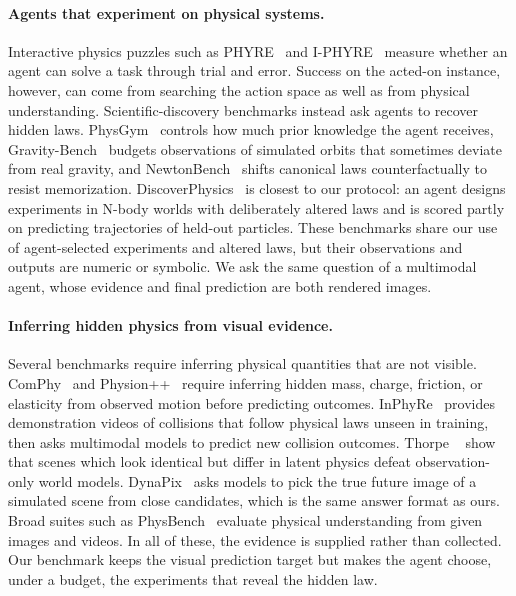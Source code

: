 \paragraph{Agents that experiment on physical systems.} Interactive physics puzzles such as PHYRE~\cite{phyre} and I-PHYRE~\cite{iphyre} measure whether an agent can solve a task through trial and error. Success on the acted-on instance, however, can come from searching the action space as well as from physical understanding. Scientific-discovery benchmarks instead ask agents to recover hidden laws. PhysGym~\cite{physgym} controls how much prior knowledge the agent receives, Gravity-Bench~\cite{gravitybench} budgets observations of simulated orbits that sometimes deviate from real gravity, and NewtonBench~\cite{newtonbench} shifts canonical laws counterfactually to resist memorization. DiscoverPhysics~\cite{discoverphysics} is closest to our protocol: an agent designs experiments in N-body worlds with deliberately altered laws and is scored partly on predicting trajectories of held-out particles. These benchmarks share our use of agent-selected experiments and altered laws, but their observations and outputs are numeric or symbolic. We ask the same question of a multimodal agent, whose evidence and final prediction are both rendered images.

\paragraph{Inferring hidden physics from visual evidence.} Several benchmarks require inferring physical quantities that are not visible. ComPhy~\cite{comphy} and Physion++~\cite{physionpp} require inferring hidden mass, charge, friction, or elasticity from observed motion before predicting outcomes. InPhyRe~\cite{inphyre} provides demonstration videos of collisions that follow physical laws unseen in training, then asks multimodal models to predict new collision outcomes. Thorpe \etal~\cite{viablewm} show that scenes which look identical but differ in latent physics defeat observation-only world models. DynaPix~\cite{dynapix} asks models to pick the true future image of a simulated scene from close candidates, which is the same answer format as ours. Broad suites such as PhysBench~\cite{physbench} evaluate physical understanding from given images and videos. In all of these, the evidence is supplied rather than collected. Our benchmark keeps the visual prediction target but makes the agent choose, under a budget, the experiments that reveal the hidden law.

